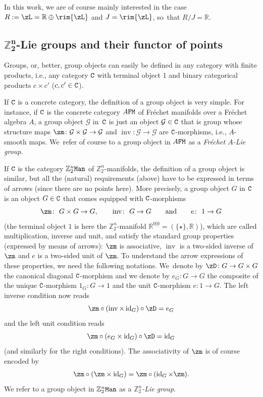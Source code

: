 \documentclass[10pt,a4paper]{amsart}
\newcommand{\op}[1]{\operatorname{#1}}
\newcommand{\R}{{\mathbb R}}
\newcommand{\Z}{{\mathbb Z}}
\def\ul{\underline}
\def\ul{\underline}
\newcommand{\0}{\otimes}
\newcommand{\id}{\op{id}}
\newcommand{\z}{\Z_2^n}
\numberwithin{equation}{section}
\begin{document}
In this work, we are of course mainly interested in the case $R:=\zL=\R\oplus\rim{\zL}$ and $J=\rim{\zL}$, so~that $R/J=\R$.

\subsection[Z2n-Lie groups and their functor of points]
{$\boldsymbol{\Z_2^n}$-Lie groups and their functor of points}

Groups, or, better, group objects can easily be defined in any category with finite products, i.e., any category $\tt C$ with terminal object $1$ and binary categorical products $c\times c'$ ($c,c'\in {\tt C}$).

\newcommand{\cG}{\mathcal{G}}

If $\tt C$ is a concrete category, the definition of a group object is very simple. For instance, if $\tt C$ is the concrete category $A\tt FM$ of Fr\'echet manifolds over a Fr\'echet algebra $A$, a group object $\cG$ in~$\tt C$ is just an object $\cG\in\tt C$ that is group whose structure maps $\zm\colon \cG\times \cG\to \cG$ and $\op{inv}\colon \cG\to \cG$ are $\tt C$-morphisms, i.e., $A$-smooth maps. We~refer of course to a group object in $A\tt FM$ as a {\it Fr\'echet $A$-Lie group}.

If $\tt C$ is the category $\z\tt Man$ of $\z$-manifolds, the definition of a group object is similar, but all the (natural) requirements (above) have to be expressed in terms of arrows (since there are no points here). More precisely, a group object $G$ in $\tt C$ is an object $G\in\tt C$ that comes equipped with $\tt C$-morphisms
\[
\zm\colon\ G\times G\to G,\qquad \op{inv}\colon\ G\to G\qquad\text{and}\qquad e\colon\ 1\to G
\]
(the terminal object $1$ is here the $\z$-manifold $\R^{0|\ul 0}=(\{\star\},\R)$), which are called multiplication, inverse and unit, and satisfy the standard group properties (expressed by means of arrows): $\zm$ is associative, $\op{inv}$ is a two-sided inverse of $\zm$ and $e$ is a two-sided unit of $\zm$. To understand the arrow expressions of these properties, we need the following notations. We~denote by $\zD\colon G\to G\times G$ the canonical diagonal $\tt C$-morphism and we denote by $e_G\colon G\to G$ the composite of the unique $\tt C$-morphism $1_G\colon G\to 1$ and the unit $\tt C$-morphism $e\colon 1\to G$. The left inverse condition now reads
\[
\zm\circ(\op{inv}\times\id_G)\circ \zD=e_G
\]
and the left unit condition reads
\[
\zm\circ (e_G\times\id_G)\circ\zD =\id_G
\]
(and similarly for the right conditions). The associativity of $\zm$ is of course encoded by \begin{gather}\label{AssG}
\zm\circ(\zm\times \id_G)=\zm\circ(\id_G\times\zm).
\end{gather}
We refer to a group object in $\z\tt Man$ as a {\it $\z$-Lie group}.
\end{document}
